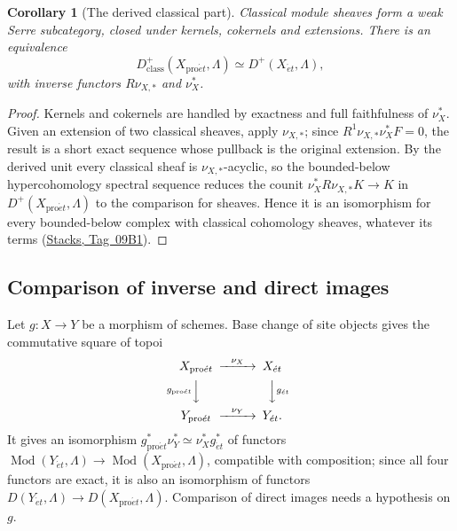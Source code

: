 \documentclass[11pt,a4paper]{article}
\numberwithin{equation}{section}
\newtheorem{corollary}[theorem]{Corollary}
\theoremstyle{definition}
\theoremstyle{remark}
\newcommand{\Mod}{\operatorname{Mod}}
\newcommand{\et}{\acute{e}t}
\newcommand{\proet}{\mathrm{pro}\acute{e}t}
\newcommand{\stacks}[1]{\href{https://stacks.math.columbia.edu/tag/#1}{\textnormal{Stacks, Tag~#1}}}
\begin{document}
\begin{corollary}[The derived classical part]
\label{pe:classical-derived}
Classical module sheaves form a weak Serre subcategory, closed under
kernels, cokernels and extensions. There is an equivalence
\[
 D^+_{\mathrm{class}}(X_{\proet},\Lambda)
   \simeq D^+(X_{\et},\Lambda),
\]
with inverse functors $R\nu_{X,*}$ and $\nu_X^*$.
\end{corollary}
\begin{proof}
Kernels and cokernels are handled by exactness and full faithfulness
of $\nu_X^*$. Given an extension of two classical sheaves, apply
$\nu_{X,*}$; since $R^1\nu_{X,*}\nu_X^*F=0$, the result is a short
exact sequence whose pullback is the original extension.
By the derived unit every classical sheaf is $\nu_{X,*}$-acyclic, so
the bounded-below hypercohomology spectral sequence reduces the counit
$\nu_X^*R\nu_{X,*}K\to K$ in $D^+(X_{\proet},\Lambda)$ to the comparison for sheaves. Hence it is
an isomorphism for every bounded-below complex with classical
cohomology sheaves, whatever its terms (\stacks{09B1}).
\end{proof}

\subsection{Comparison of inverse and direct images}
\label{pe:functor-comparison-section}
Let $g:X\to Y$ be a morphism of schemes. Base change of site objects
gives the commutative square of topoi
\[
\begin{CD}
 X_{\proet}@>{\nu_X}>>X_{\et}\\
 @V{g_{\proet}}VV @VV{g_{\et}}V\\
 Y_{\proet}@>{\nu_Y}>>Y_{\et}.
\end{CD}
\]
It gives an isomorphism
$g_{\proet}^*\nu_Y^*\simeq\nu_X^*g_{\et}^*$ of functors
$\Mod(Y_{\et},\Lambda)\to\Mod(X_{\proet},\Lambda)$, compatible with
composition; since all four functors are exact, it is also an
isomorphism of functors $D(Y_{\et},\Lambda)\to D(X_{\proet},\Lambda)$.
Comparison of direct images needs a hypothesis on $g$.
\end{document}
